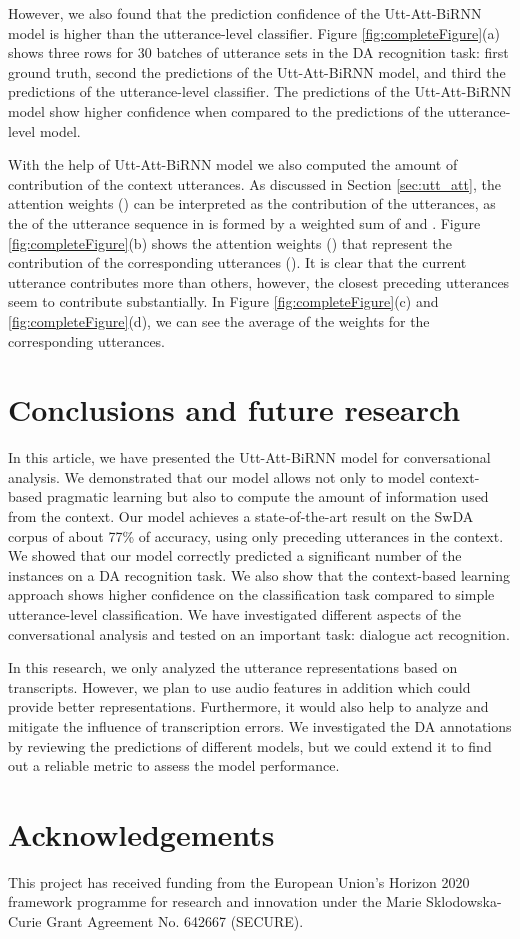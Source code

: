 \documentclass[a4paper]{article}
\begin{document}
However, we also found that the prediction confidence of the Utt-Att-BiRNN model is higher than the utterance-level classifier. Figure \ref{fig:completeFigure}(a) shows three rows for 30 batches of utterance sets in the DA recognition task: first ground truth, second the predictions of the Utt-Att-BiRNN model, and third the predictions of the utterance-level classifier.
The predictions of the Utt-Att-BiRNN model show higher confidence when compared to the predictions of the utterance-level model.


With the help of Utt-Att-BiRNN model we also computed the amount of contribution of the context utterances.
As discussed in Section \ref{sec:utt_att}, the attention weights () can be interpreted as the contribution of the utterances, as the  of the utterance sequence in  is formed by a weighted sum of  and .
Figure \ref{fig:completeFigure}(b) shows the attention weights () that represent the contribution of the corresponding utterances ().
It is clear that the current utterance  contributes more than others, however, the closest preceding utterances seem to contribute substantially.
In Figure \ref{fig:completeFigure}(c) and \ref{fig:completeFigure}(d), we can see the average of the weights for the corresponding utterances.


\section{Conclusions and future research}

In this article, we have presented the Utt-Att-BiRNN model for conversational analysis.
We demonstrated that our model allows not only to model context-based pragmatic learning but also to compute the amount of information used from the context. 
Our model achieves a state-of-the-art result on the SwDA corpus of about 77\% of accuracy, using only preceding utterances in the context.
We showed that our model correctly predicted a significant number of the instances on a DA recognition task. 
We also show that the context-based learning approach shows higher confidence on the classification task compared to simple utterance-level classification.
We have investigated different aspects of the conversational analysis and tested on an important task: dialogue act recognition.

In this research, we only analyzed the utterance representations based on transcripts. 
However, we plan to use audio features in addition which could provide better representations.
Furthermore, it would also help to analyze and mitigate the influence of transcription errors.
We investigated the DA annotations by reviewing the predictions of different models, but we could extend it to find out a reliable metric to assess the model performance.
\balance

\section{Acknowledgements}

This project has received funding from the European Union's Horizon 2020 framework programme for research and innovation under the Marie Sklodowska-Curie Grant Agreement No. 642667 (SECURE).



\end{document}

